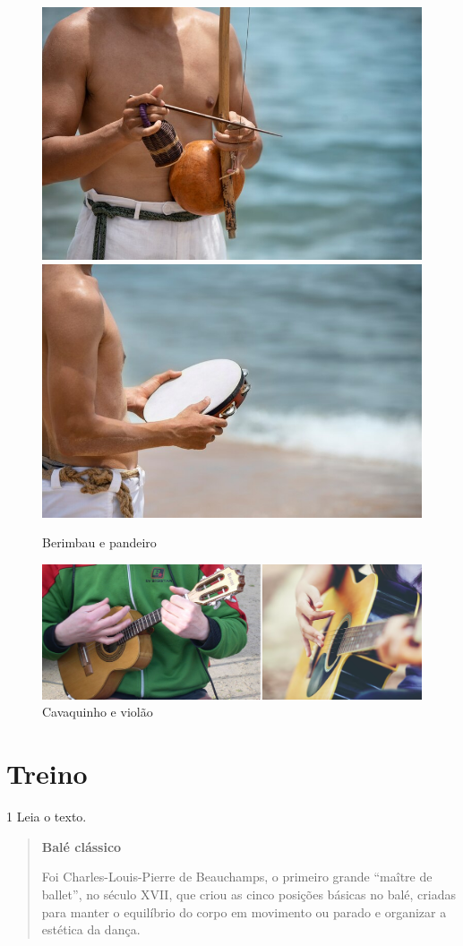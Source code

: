 \begin{figure}[htpb!]
\includegraphics[width=.5\textwidth]{./imgs/art19a.jpg}
\includegraphics[width=.5\textwidth]{./imgs/art19b.jpg}
\caption{Berimbau e pandeiro}
\end{figure}

\begin{figure}[htpb!]
\acima{( ) \hfill( )}
\includegraphics[width=\textwidth]{./imgs/art19cd.png}
\caption{Cavaquinho e violão}
\end{figure}

\section{Treino}

\num{1} Leia o texto.

\begin{quote}
\textbf{Balé clássico}

Foi Charles-Louis-Pierre de Beauchamps, o primeiro grande ``maître de ballet'', no século XVII, que criou as cinco posições básicas no balé, criadas para manter o equilíbrio do corpo em movimento ou parado e organizar a estética da dança.

\end{quote}

